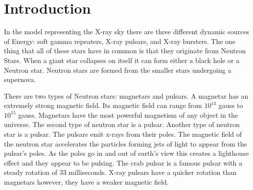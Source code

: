 \documentclass[final,6p,times,twocolumn,authoryear]{elsarticle}
\begin{document}
\begin{frontmatter}







\end{frontmatter}




\section{Introduction}
\label{introduction}
In the model representing the X-ray sky there are three different dynamic sources of Energy: soft gamma repeaters, X-ray pulsars, and X-ray bursters. The one thing that all of these stars have in common is that they originate from Neutron Stars. When a giant star collapses on itself it can form either a black hole or a Neutron star. Neutron stars are formed from the smaller stars undergoing a supernova. 

There are two types of Neutron stars: magnetars and pulsars. A magnetar has an extremely strong magnetic field. Its magnetic field can range from $10^{13}$ gauss to $10^{15}$ gauss. Magnetars have the most powerful magnetism of any object in the universe. The second type of neutron star is a pulsar. Another type of neutron star is a pulsar. The pulsars emit x-rays from their poles. The magnetic field of the neutron star accelerates the particles forming jets of light to appear from the pulsar's poles. As the poles go in and out of earth's view this creates a lighthouse effect and they appear to be pulsing. The crab pulsar is a famous pulsar with a steady rotation of 33 milliseconds. X-ray pulsars have a quicker rotation than magnetars however, they have a weaker magnetic field. 
\end{document}
